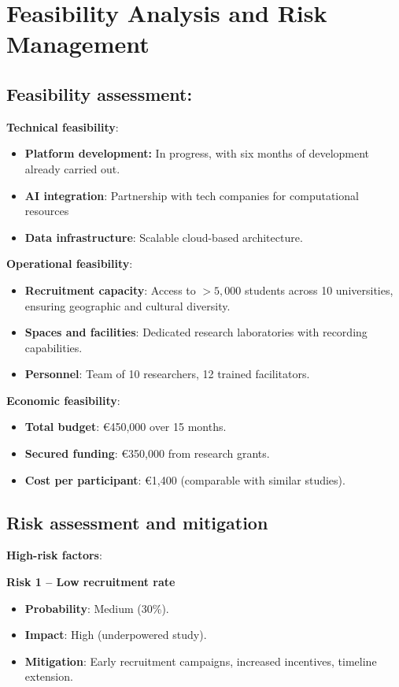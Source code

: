 \section{Feasibility Analysis and Risk Management}
\subsection*{Feasibility assessment:}

\textbf{Technical feasibility}:
\begin{itemize}
	\item \textbf{Platform development:} In progress, with six months of development already carried out.
	\item \textbf{AI integration}: Partnership with tech companies for computational resources
	\item \textbf{Data infrastructure}: Scalable cloud-based architecture.
\end{itemize}

\textbf{Operational feasibility}:
\begin{itemize}
	\item \textbf{Recruitment capacity}: Access to $>5,000$ students across 10 universities, ensuring geographic and cultural diversity.
	\item \textbf{Spaces and facilities}: Dedicated research laboratories with recording capabilities.
	\item \textbf{Personnel}: Team of 10 researchers, 12 trained facilitators.
\end{itemize}

\textbf{Economic feasibility}:
\begin{itemize}
	\item \textbf{Total budget}: €450,000 over 15 months.
	\item \textbf{Secured funding}: €350,000 from research grants.
	\item \textbf{Cost per participant}: €1,400 (comparable with similar studies).
\end{itemize}

\subsection{Risk assessment and mitigation}

\textbf{High-risk factors}:

\textbf{Risk 1 -- Low recruitment rate}
\begin{itemize}
	\item \textbf{Probability}: Medium (30\%).
	\item \textbf{Impact}: High (underpowered study).
	\item \textbf{Mitigation}: Early recruitment campaigns, increased incentives, timeline extension.
\end{itemize}

